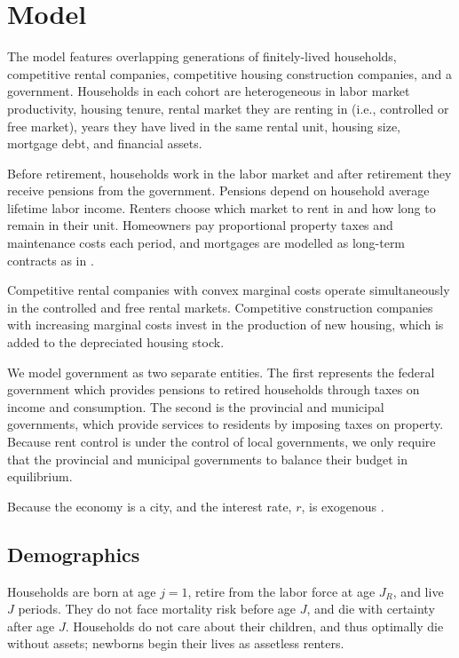 \documentclass[parskip=full]{article}
\begin{document}
\section{Model}\label{sec:model}

The model features overlapping generations of finitely-lived households, competitive rental companies, competitive housing construction companies, and a government. Households in each cohort are heterogeneous in labor market productivity, housing tenure, rental market they are renting in (i.e., controlled or free market), years they have lived in the same rental unit, housing size, mortgage debt, and financial assets. 

Before retirement, households work in the labor market and after retirement they receive pensions from the government. Pensions depend on household average lifetime labor income. Renters choose which market to rent in and how long to remain in their unit. Homeowners pay proportional property taxes and maintenance costs each period, and mortgages are modelled as long-term contracts as in \citet{rs-2023}. 

Competitive rental companies with convex marginal costs operate simultaneously in the controlled and free rental markets. Competitive construction companies with increasing marginal costs invest in the production of new housing, which is added to the depreciated housing stock. 

We model government as two separate entities. The first represents the federal government which provides pensions to retired households through taxes on income and consumption. The second is the provincial and municipal governments, which provide services to residents by imposing taxes on property. Because rent control is under the control of local governments, we only require that the provincial and municipal governments to balance their budget in equilibrium. 

Because the economy is a city, and the interest rate, $r$, is exogenous \citep{sommeretal-2013,arslanetal-2015,sommersullivan-2017,kaplanetal-2019}. 

\subsection{Demographics}\label{subsection:demographics}

Households are born at age $j=1$, retire from the labor force at age $J_{R}$, and live $J$ periods. They do not face mortality risk before age $J$, and die with certainty after age $J$. Households do not care about their children, and thus optimally die without assets; newborns begin their lives as assetless renters.
\end{document}
